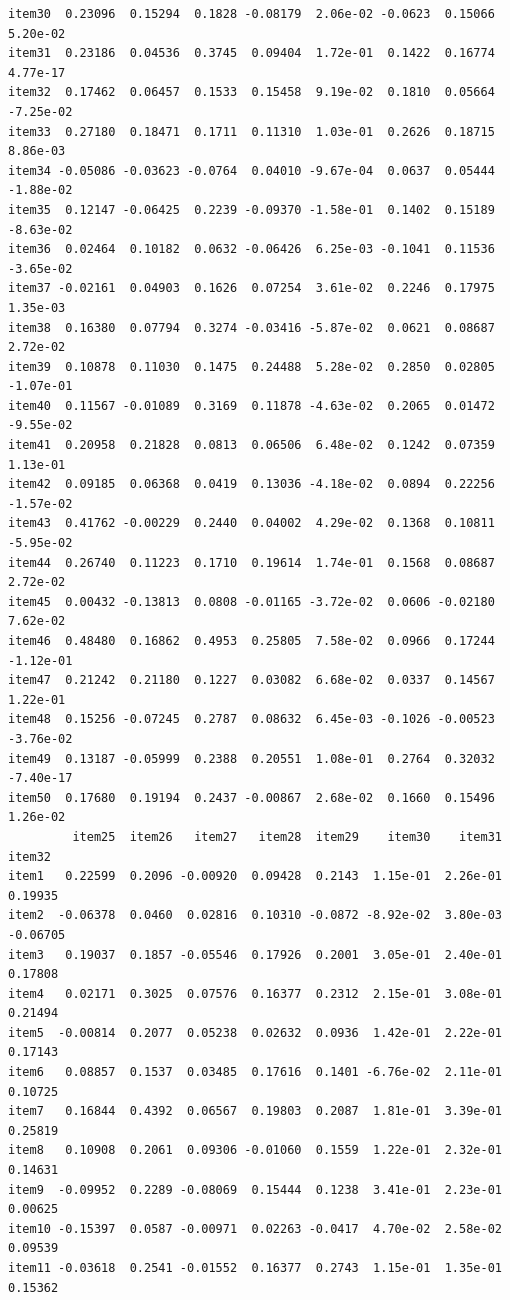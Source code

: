 \documentclass[
  a4paper,
]{ltjsbook}
\begin{document}
\begin{verbatim}
item30  0.23096  0.15294  0.1828 -0.08179  2.06e-02 -0.0623  0.15066  5.20e-02
item31  0.23186  0.04536  0.3745  0.09404  1.72e-01  0.1422  0.16774  4.77e-17
item32  0.17462  0.06457  0.1533  0.15458  9.19e-02  0.1810  0.05664 -7.25e-02
item33  0.27180  0.18471  0.1711  0.11310  1.03e-01  0.2626  0.18715  8.86e-03
item34 -0.05086 -0.03623 -0.0764  0.04010 -9.67e-04  0.0637  0.05444 -1.88e-02
item35  0.12147 -0.06425  0.2239 -0.09370 -1.58e-01  0.1402  0.15189 -8.63e-02
item36  0.02464  0.10182  0.0632 -0.06426  6.25e-03 -0.1041  0.11536 -3.65e-02
item37 -0.02161  0.04903  0.1626  0.07254  3.61e-02  0.2246  0.17975  1.35e-03
item38  0.16380  0.07794  0.3274 -0.03416 -5.87e-02  0.0621  0.08687  2.72e-02
item39  0.10878  0.11030  0.1475  0.24488  5.28e-02  0.2850  0.02805 -1.07e-01
item40  0.11567 -0.01089  0.3169  0.11878 -4.63e-02  0.2065  0.01472 -9.55e-02
item41  0.20958  0.21828  0.0813  0.06506  6.48e-02  0.1242  0.07359  1.13e-01
item42  0.09185  0.06368  0.0419  0.13036 -4.18e-02  0.0894  0.22256 -1.57e-02
item43  0.41762 -0.00229  0.2440  0.04002  4.29e-02  0.1368  0.10811 -5.95e-02
item44  0.26740  0.11223  0.1710  0.19614  1.74e-01  0.1568  0.08687  2.72e-02
item45  0.00432 -0.13813  0.0808 -0.01165 -3.72e-02  0.0606 -0.02180  7.62e-02
item46  0.48480  0.16862  0.4953  0.25805  7.58e-02  0.0966  0.17244 -1.12e-01
item47  0.21242  0.21180  0.1227  0.03082  6.68e-02  0.0337  0.14567  1.22e-01
item48  0.15256 -0.07245  0.2787  0.08632  6.45e-03 -0.1026 -0.00523 -3.76e-02
item49  0.13187 -0.05999  0.2388  0.20551  1.08e-01  0.2764  0.32032 -7.40e-17
item50  0.17680  0.19194  0.2437 -0.00867  2.68e-02  0.1660  0.15496  1.26e-02
         item25  item26   item27   item28  item29    item30    item31   item32
item1   0.22599  0.2096 -0.00920  0.09428  0.2143  1.15e-01  2.26e-01  0.19935
item2  -0.06378  0.0460  0.02816  0.10310 -0.0872 -8.92e-02  3.80e-03 -0.06705
item3   0.19037  0.1857 -0.05546  0.17926  0.2001  3.05e-01  2.40e-01  0.17808
item4   0.02171  0.3025  0.07576  0.16377  0.2312  2.15e-01  3.08e-01  0.21494
item5  -0.00814  0.2077  0.05238  0.02632  0.0936  1.42e-01  2.22e-01  0.17143
item6   0.08857  0.1537  0.03485  0.17616  0.1401 -6.76e-02  2.11e-01  0.10725
item7   0.16844  0.4392  0.06567  0.19803  0.2087  1.81e-01  3.39e-01  0.25819
item8   0.10908  0.2061  0.09306 -0.01060  0.1559  1.22e-01  2.32e-01  0.14631
item9  -0.09952  0.2289 -0.08069  0.15444  0.1238  3.41e-01  2.23e-01  0.00625
item10 -0.15397  0.0587 -0.00971  0.02263 -0.0417  4.70e-02  2.58e-02  0.09539
item11 -0.03618  0.2541 -0.01552  0.16377  0.2743  1.15e-01  1.35e-01  0.15362

\end{verbatim}
\end{document}
